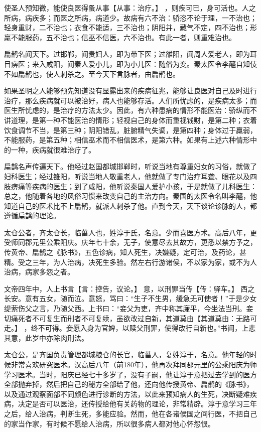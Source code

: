 \documentclass[12pt,UTF8]{ctexbook}
\begin{document}
使圣人预知微，能使良医得蚤从事【从事：治疗。】 ，则疾可已，身可活也。人之所病，病疾多；而医之所病，病道少。故病有六不治：骄恣不论于理，一不治也；轻身重财，二不治也；衣食不能适，三不治也；阴阳并，藏气不定，四不治也；形羸不能服药，五不治也；信巫不信医，六不治也。有此一者，则重难治也。

扁鹊名闻天下。过邯郸，闻贵妇人，即为带下医；过雒阳，闻周人爱老人，即为耳目痹医；来入咸阳，闻秦人爱小儿，即为小儿医：随俗为变。秦太医令李醯自知伎不如扁鹊也，使人刺杀之。至今天下言脉者，由扁鹊也。

如果圣明之人能够预先知道没有显露出来的疾病征兆，能够让良医对自己及时进行治疗，那么疾病就可以被治好，病人也能够存活。人们所忧虑的，是疾病太多；而医生所忧虑的，是治疗的方法太少。因此，有六种患病的情形不能医治：骄纵而不讲道理，是第一种不能医治的情形；轻视自己的身体而重视钱财，是第二种；衣着饮食调节不当，是第三种；阴阳错乱，脏腑精气失调，是第四种；身体过于羸弱，不能服药，是第五种；相信巫术而不相信医术，是第六种。如果有上述六种情形中的一种，疾病就很难治疗了。

扁鹊名声传遍天下。他经过赵国都城邯郸时，听说当地有尊重妇女的习俗，就做了妇科医生；经过雒阳，听说当地人敬重老人，他就做了专门治疗耳聋、眼花以及四肢痹痛等疾病的医生；到了咸阳，他听说秦国人爱护小孩，于是就做了儿科医生：总之，他随着各地的风俗习惯来改变自己的主治方向。秦国的太医令名叫李醯，他知道自己的医术比不上扁鹊，就派人刺杀了他。直到今天，天下谈论诊脉的人，都遵循扁鹊的理论。

太仓公者，齐太仓长，临菑人也，姓淳于氏，名意。少而喜医方术。高后八年，更受师同郡元里公乘阳庆。庆年七十余，无子，使意尽去其故方，更悉以禁方予之，传黄帝、扁鹊之《脉书》，五色诊病，知人死生，决嫌疑，定可治，及药论，甚精。受之三年，为人治病，决死生多验。然左右行游诸侯，不以家为家，或不为人治病，病家多怨之者。

文帝四年中，人上书言【言：控告，议论。】 意，以刑罪当传【传：驿车。】 西之长安。意有五女，随而泣。意怒，骂曰：“生子不生男，缓急无可使者！”于是少女缇萦伤父之言，乃随父西。上书曰：“妾父为吏，齐中称其廉平，今坐法当刑。妾切痛死者不可复生而刑者不可复续，虽欲改过自新，其道莫由【其道莫由：无路可走。】 ，终不可得。妾愿入身为官婢，以赎父刑罪，使得改行自新也。”书闻，上悲其意，此岁中亦除肉刑法。

太仓公，是齐国负责管理都城粮仓的长官，临菑人，复姓淳于，名意。他年轻的时候非常喜欢研究医术。汉高后八年（前180年），他再次拜同郡元里的公乘阳庆为师学习医术。当时，阳庆已经七十多岁了，没有子嗣，他让淳于意把过去学到的医方全部抛弃掉，然后把自己的秘方全部给了他，还向他传授黄帝、扁鹊的《脉书》，以及通过观察面部不同颜色进行诊断的方法，以此来预知病人的生死，决断疑难疾病，决定是否可以医治，还传授给他有关药物的理论，非常精辟。淳于意学习三年之后，给人治病，判断生死，多能应验。然而，他在各诸侯国之间行医，不把自己的家当作家，有时候不愿给人治病，所以很多病人都对他心怀怨恨。
\end{document}
